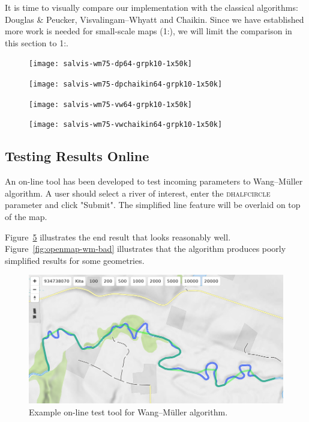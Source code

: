 \documentclass[a4paper]{article}
\newcommand{\DP}{Douglas \& Peucker}
\newcommand{\VW}{Visvalingam--Whyatt}
\newcommand{\WM}{Wang--M{\"u}ller}
\begin{document}
It is time to visually compare our implementation with the classical
algorithms: {\DP}, {\VW} and Chaikin. Since we have established more work is
needed for small-scale maps (1:), we will limit the comparison
in this section to 1:.

\begin{figure}[h!]
    \texttt{[image: salvis-wm75-dp64-grpk10-1x50k]}
    \caption{}
    \label{fig:salvis-wm75-dp64-grpk10-1x50k}
\end{figure}

\begin{figure}[h!]
    \texttt{[image: salvis-wm75-dpchaikin64-grpk10-1x50k]}
    \caption{}
    \label{fig:salvis-wm75-dpchaikin64-grpk10-1x50k}
\end{figure}

\clearpage

\begin{figure}[h!]
    \texttt{[image: salvis-wm75-vw64-grpk10-1x50k]}
    \caption{}
    \label{fig:salvis-wm75-vw64-grpk10-1x50k}
\end{figure}

\begin{figure}[h!]
    \texttt{[image: salvis-wm75-vwchaikin64-grpk10-1x50k]}
    \caption{}
    \label{fig:salvis-wm75-vwchaikin64-grpk10-1x50k}
\end{figure}

\clearpage

\subsection{Testing Results Online}
\label{sec:testing-results-online}

An on-line tool\cite{openmapwm} has been developed to test incoming parameters
to {\WM} algorithm. A user should select a river of interest, enter the
\textsc{dhalfcircle} parameter and click "Submit". The simplified line feature
will be overlaid on top of the map.

Figure~\ref{fig:openmap-wm-good} illustrates the end result that looks
reasonably well. Figure~\ref{fig:openmap-wm-bad} illustrates that the algorithm
produces poorly simplified results for some geometries.

\begin{figure}[ht]
    \centering
    \includegraphics[width=\textwidth]{openmap-wm-good.png}
    \caption{Example on-line test tool for {\WM} algorithm.}
    \label{fig:openmap-wm-good}
\end{figure}
\end{document}
